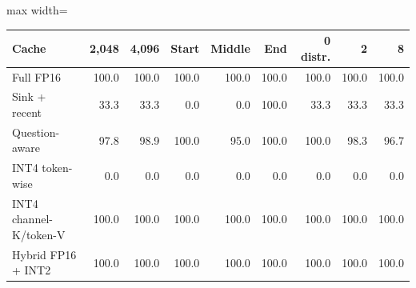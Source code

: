 \scriptsize
\setlength{\tabcolsep}{3.5pt}
\label{tab:t2cfactor}
\begin{adjustbox}{max width=\linewidth}
\begin{tabular}{lrrrrrrrr}
\toprule
Cache & 2,048 & 4,096 & Start & Middle & End & 0 distr. & 2 & 8 \\
\midrule
Full FP16 & 100.0 & 100.0 & 100.0 & 100.0 & 100.0 & 100.0 & 100.0 & 100.0 \\
Sink + recent & 33.3 & 33.3 & 0.0 & 0.0 & 100.0 & 33.3 & 33.3 & 33.3 \\
Question-aware & 97.8 & 98.9 & 100.0 & 95.0 & 100.0 & 100.0 & 98.3 & 96.7 \\
INT4 token-wise & 0.0 & 0.0 & 0.0 & 0.0 & 0.0 & 0.0 & 0.0 & 0.0 \\
INT4 channel-K/token-V & 100.0 & 100.0 & 100.0 & 100.0 & 100.0 & 100.0 & 100.0 & 100.0 \\
Hybrid FP16 + INT2 & 100.0 & 100.0 & 100.0 & 100.0 & 100.0 & 100.0 & 100.0 & 100.0 \\
\bottomrule
\end{tabular}
\end{adjustbox}
